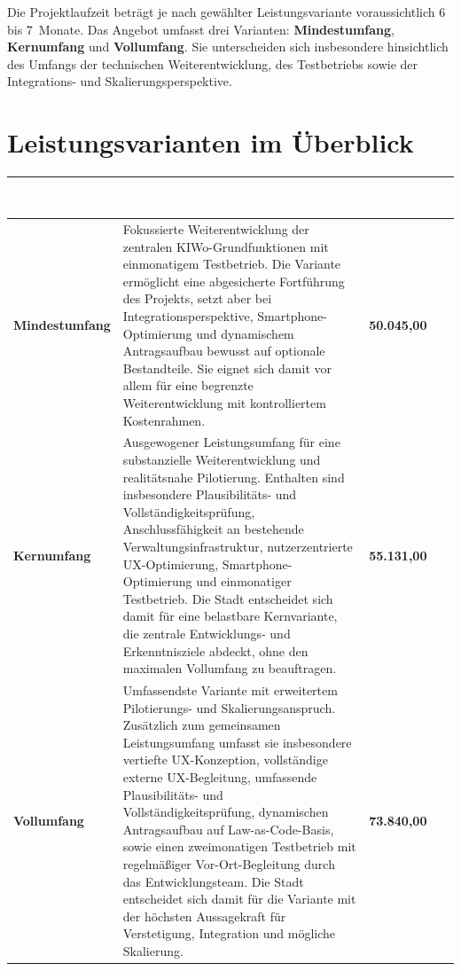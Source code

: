 \documentclass[11pt,a4paper,openany]{report}
\newcommand{\tblhead}[1]{\cellcolor{tabhead}\textbf{\textcolor{white}{\sffamily #1}}}
\newcommand{\tblrowalt}{\rowcolor{tabrowalt}}
\begin{document}
Die Projektlaufzeit beträgt je nach gewählter Leistungsvariante
voraussichtlich 6 bis 7~Monate. Das Angebot umfasst drei Varianten:
\textbf{Mindestumfang}, \textbf{Kernumfang} und \textbf{Vollumfang}. Sie
unterscheiden sich insbesondere hinsichtlich des Umfangs der technischen
Weiterentwicklung, des Testbetriebs sowie der Integrations- und
Skalierungsperspektive.

\section{Leistungsvarianten im Überblick}

{
\begin{tabularx}{\textwidth}{@{} >{\sffamily\bfseries\color{primarycolor}}l X >{\raggedleft\arraybackslash\bfseries}p{2.6cm} @{}}
  \toprule
  \tblhead{\hspace{0.2em}Variante} & \tblhead{\hspace{0.2em}Kurzbeschreibung} & \tblhead{Gesamtpreis brutto\hspace{0.2em}} \\
  \midrule
  Mindestumfang
    & Fokussierte Weiterentwicklung der zentralen KIWo-Grundfunktionen mit
      einmonatigem Testbetrieb. Die Variante ermöglicht eine abgesicherte
      Fortführung des Projekts, setzt aber bei Integrationsperspektive,
      Smartphone-Optimierung und dynamischem Antragsaufbau bewusst auf
      optionale Bestandteile. Sie eignet sich damit vor allem für eine
      begrenzte Weiterentwicklung mit kontrolliertem Kostenrahmen.
    & 50.045{,}00~\texteuro{} \\
  \midrule
  \tblrowalt Kernumfang
    & \cellcolor{tabrowalt} Ausgewogener Leistungsumfang für eine substanzielle
      Weiterentwicklung und realitätsnahe Pilotierung. Enthalten sind
      insbesondere Plausibilitäts- und Vollständigkeitsprüfung,
      Anschlussfähigkeit an bestehende Verwaltungsinfrastruktur,
      nutzerzentrierte UX-Optimierung, Smartphone-Optimierung und
      einmonatiger Testbetrieb. Die Stadt entscheidet sich damit für eine
      belastbare Kernvariante, die zentrale Entwicklungs- und
      Erkenntnisziele abdeckt, ohne den maximalen Vollumfang zu beauftragen.
    & \cellcolor{tabrowalt} 55.131{,}00~\texteuro{} \\
  \midrule
  Vollumfang
    & Umfassendste Variante mit erweitertem Pilotierungs- und
      Skalierungsanspruch. Zusätzlich zum gemeinsamen Leistungsumfang
      umfasst sie insbesondere vertiefte UX-Konzeption, vollständige
      externe UX-Begleitung, umfassende Plausibilitäts- und
      Vollständigkeitsprüfung, dynamischen Antragsaufbau auf
      Law-as-Code-Basis, sowie einen zweimonatigen Testbetrieb mit
      regelmäßiger Vor-Ort-Begleitung durch das Entwicklungsteam. Die
      Stadt entscheidet sich damit für die Variante mit der höchsten
      Aussagekraft für Verstetigung, Integration und mögliche Skalierung.
    & 73.840{,}00~\texteuro{} \\
  \bottomrule
\end{tabularx}}
\end{document}
